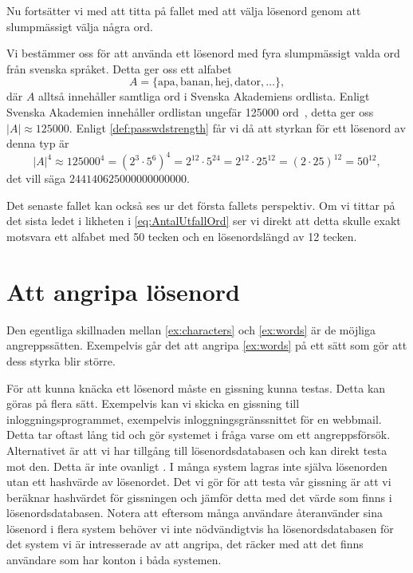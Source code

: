 Nu fortsätter vi med att titta på fallet med att välja lösenord genom att
slumpmässigt välja några ord.
\begin{example}\label{ex:words}
  Vi bestämmer oss för att använda ett lösenord med fyra slumpmässigt valda
  ord från svenska språket.
  Detta ger oss ett alfabet \[A = \{\text{apa}, \text{banan}, \text{hej}, 
  \text{dator}, \ldots\},\]
  där \(A\) alltså innehåller samtliga ord i Svenska Akademiens ordlista.
  Enligt Svenska Akademien innehåller ordlistan ungefär 125000 ord~\cite{SAOL}, 
  detta ger oss \(|A| \approx 125000\).
  Enligt \cref{def:passwdstrength} får vi då att styrkan för ett lösenord 
  av denna typ är
  \begin{equation}\label{eq:AntalUtfallOrd}
    |A|^4 \approx 125000^4 = (2^3\cdot 5^6)^4
      = 2^{12}\cdot 5^{24}
      = 2^{12}\cdot 25^{12}
      = (2\cdot 25)^{12} = 50^{12},
  \end{equation}
  det vill säga \(244140625000000000000\).
\end{example}
Det senaste fallet kan också ses ur det första fallets perspektiv.
Om vi tittar på det sista ledet i likheten i \cref{eq:AntalUtfallOrd} ser 
vi direkt att detta skulle exakt motsvara ett alfabet med 50 tecken och en 
lösenordslängd av 12 tecken.


\section{Att angripa lösenord}
\label{sec:attack}
Den egentliga skillnaden mellan \cref{ex:characters} och 
\cref{ex:words} är de möjliga angreppssätten.
Exempelvis går det att angripa \cref{ex:words} på ett sätt som gör att 
dess styrka blir större.

För att kunna knäcka ett lösenord måste en gissning kunna testas.
Detta kan göras på flera sätt.
Exempelvis kan vi skicka en gissning till inloggningsprogrammet, exempelvis 
inloggningsgränssnittet för en webbmail.
Detta tar oftast lång tid och gör systemet i fråga varse om ett angreppsförsök.
Alternativet är att vi har tillgång till lösenordsdatabasen och kan direkt 
testa mot den.
Detta är inte ovanligt 
\citep[jmf.][]{Cubrilovic2009rhf,Oberheide2010bao,Hunt2011abs,Cluley2012twp}.
I många system lagras inte själva lösenorden utan ett hashvärde av lösenordet.
Det vi gör för att testa vår gissning är att vi beräknar hashvärdet för 
gissningen och jämför detta med det värde som finns i lösenordsdatabasen.
Notera att eftersom många användare återanvänder sina lösenord i flera system 
behöver vi inte nödvändigtvis ha lösenordsdatabasen för det system vi är 
intresserade av att angripa, det räcker med att det finns användare som har 
konton i båda systemen.

